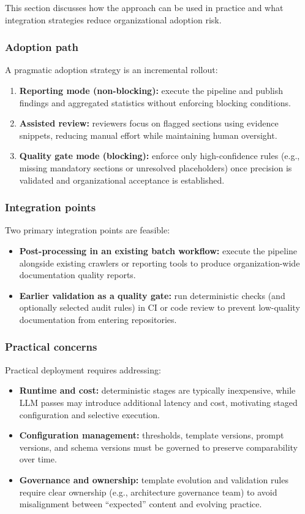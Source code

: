 This section discusses how the approach can be used in practice and what integration strategies reduce organizational adoption risk.

\subsubsection{Adoption path}
A pragmatic adoption strategy is an incremental rollout:

\begin{enumerate}
    \item \textbf{Reporting mode (non-blocking):} execute the pipeline and publish findings and aggregated statistics without enforcing blocking conditions.
    \item \textbf{Assisted review:} reviewers focus on flagged sections using evidence snippets, reducing manual effort while maintaining human oversight.
    \item \textbf{Quality gate mode (blocking):} enforce only high-confidence rules (e.g., missing mandatory sections or unresolved placeholders) once precision is validated and organizational acceptance is established.
\end{enumerate}

\subsubsection{Integration points}
Two primary integration points are feasible:
\begin{itemize}
    \item \textbf{Post-processing in an existing batch workflow:} execute the pipeline alongside existing crawlers or reporting tools to produce organization-wide documentation quality reports.
    \item \textbf{Earlier validation as a quality gate:} run deterministic checks (and optionally selected audit rules) in CI or code review to prevent low-quality documentation from entering repositories.
\end{itemize}

\subsubsection{Practical concerns}
Practical deployment requires addressing:
\begin{itemize}
    \item \textbf{Runtime and cost:} deterministic stages are typically inexpensive, while LLM passes may introduce additional latency and cost, motivating staged configuration and selective execution.
    \item \textbf{Configuration management:} thresholds, template versions, prompt versions, and schema versions must be governed to preserve comparability over time.
    \item \textbf{Governance and ownership:} template evolution and validation rules require clear ownership (e.g., architecture governance team) to avoid misalignment between ``expected'' content and evolving practice.
\end{itemize}

